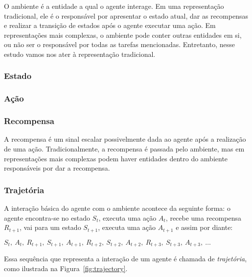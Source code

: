\documentclass{article}
\begin{document}
                O ambiente é a entidade a qual o agente interage. Em uma representação tradicional, ele é o responsável por apresentar o estado atual, dar as recompensas e realizar a transição de estados após o agente executar uma ação. Em representações mais complexas, o ambiente pode conter outras entidades em si, ou não ser o responsável por todas as tarefas mencionadas. Entretanto, nesse estudo vamos nos ater à representação tradicional.
            
            \subsubsection{Estado}
            \subsubsection{Ação}
            \subsubsection{Recompensa}
            
                A recompensa é um sinal escalar possivelmente dada ao agente após a realização de uma ação. Tradicionalmente, a recompensa é passada pelo ambiente, mas em representações mais complexas podem haver entidades dentro do ambiente responsáveis por dar a recompensa. 
            
            \subsubsection{Trajetória}
            
                A interação básica do agente com o ambiente acontece da seguinte forma: o agente encontra-se no estado $S_t$, executa uma ação $A_t$, recebe uma recompensa $R_{t+1}$, vai para um estado $S_{t+1}$, executa uma ação $A_{t+1}$ e assim por diante:

                $S_t,\ A_t,\ R_{t+1},\ S_{t+1},\ A_{t+1},\ R_{t+2},\ S_{t+2},\ A_{t+2},\ R_{t+3},\ S_{t+3},\ A_{t+3},\ \dots$
                
                Essa sequência que representa a interação de um agente é chamada de \emph{trajetória}, como ilustrada na Figura~\ref{fig:trajectory}.
\end{document}
